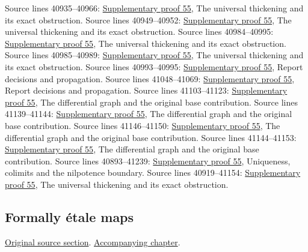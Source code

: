 \begin{AlgebraSourceRoutes}
 Source lines 40935--40966: \hyperlink{algebra_conormal_thickening_notes_20260928}{Supplementary proof 55}, The universal thickening and its exact obstruction.
 Source lines 40949--40952: \hyperlink{algebra_conormal_thickening_notes_20260928}{Supplementary proof 55}, The universal thickening and its exact obstruction.
 Source lines 40984--40995: \hyperlink{algebra_conormal_thickening_notes_20260928}{Supplementary proof 55}, The universal thickening and its exact obstruction.
 Source lines 40985--40989: \hyperlink{algebra_conormal_thickening_notes_20260928}{Supplementary proof 55}, The universal thickening and its exact obstruction.
 Source lines 40993--40995: \hyperlink{algebra_conormal_thickening_notes_20260928}{Supplementary proof 55}, Report decisions and propagation.
 Source lines 41048--41069: \hyperlink{algebra_conormal_thickening_notes_20260928}{Supplementary proof 55}, Report decisions and propagation.
 Source lines 41103--41123: \hyperlink{algebra_conormal_thickening_notes_20260928}{Supplementary proof 55}, The differential graph and the original base contribution.
 Source lines 41139--41144: \hyperlink{algebra_conormal_thickening_notes_20260928}{Supplementary proof 55}, The differential graph and the original base contribution.
 Source lines 41146--41150: \hyperlink{algebra_conormal_thickening_notes_20260928}{Supplementary proof 55}, The differential graph and the original base contribution.
 Source lines 41144--41153: \hyperlink{algebra_conormal_thickening_notes_20260928}{Supplementary proof 55}, The differential graph and the original base contribution.
 Source lines 40893--41239: \hyperlink{algebra_conormal_thickening_notes_20260928}{Supplementary proof 55}, Uniqueness, colimits and the nilpotence boundary.
 Source lines 40919--41154: \hyperlink{algebra_conormal_thickening_notes_20260928}{Supplementary proof 55}, The universal thickening and its exact obstruction.
\end{AlgebraSourceRoutes}

\subsection{Formally \'etale maps}
\hypertarget{algebra-source-section-formally-etale}{}
\noindent\href{https://github.com/stacks/stacks-project/blob/a04446e57ec1fbc252a871afcec7752fb2807b14/algebra.tex\#L41164}{Original source section}. \href{algebra.pdf\#nameddest=section-formally-etale}{Accompanying chapter}.

